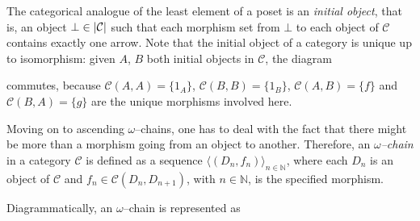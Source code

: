 The categorical analogue of the least element of a poset is an \emph{initial object}, that is, an object \(\bot \in \lvert \mathcal{C} \rvert\) such that each morphism set from \(\bot\) to each object of \(\mathcal{C}\) contains exactly one arrow. %
Note that the initial object of a category is unique up to isomorphism: given \(A\), \(B\) both initial objects in \(\mathcal{C}\), the diagram
\begin{center}
\end{center}
commutes, because \(\mathcal{C}(A,A) = \lbrace 1_A \rbrace\), \(\mathcal{C}(B,B) = \lbrace 1_B \rbrace\), \(\mathcal{C}(A,B) = \lbrace f \rbrace\) and \(\mathcal{C}(B,A) = \lbrace g \rbrace\) are the unique morphisms involved here. %

Moving on to ascending \(\omega\)--chains, one has to deal with the fact that there might be more than a morphism going from an object to another. %
Therefore, an \emph{\(\omega\)--chain} in a category \(\mathcal{C}\) is defined as a sequence \({\langle (D_n,f_n) \rangle}_{n \in \mathbb{N}}\), where each \(D_n\) is an object of \(\mathcal{C}\) and \(f_n \in \mathcal{C}(D_n, D_{n+1})\), with \(n \in \mathbb{N}\), is the specified morphism. %

Diagrammatically, an \(\omega\)--chain is represented as %
\begin{center}
\end{center}

